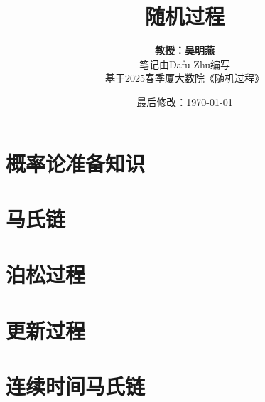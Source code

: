 \documentclass{article}
\title{随机过程}
\author{\textbf{教授：吴明燕} \\ 笔记由Dafu Zhu编写 \\ 基于2025春季厦大数院《随机过程》}
\date{最后修改：\today}
\begin{document}
\maketitle

\tableofcontents

\pagebreak

\section{概率论准备知识}







\pagebreak

\section{马氏链}










\pagebreak

\section{泊松过程}





\pagebreak

\section{更新过程}


\pagebreak

\section{连续时间马氏链}



\pagebreak



\end{document}
